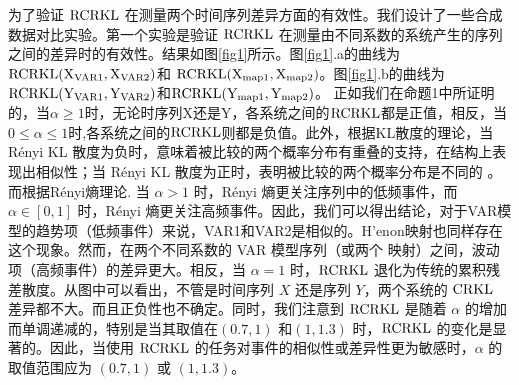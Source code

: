 为了验证 $\rm{RCRKL}$ 在测量两个时间序列差异方面的有效性。我们设计了一些合成数据对比实验。第一个实验是验证 $\rm{RCRKL}$ 在测量由不同系数的系统产生的序列之间的差异时的有效性。结果如图\ref{fig1}所示。图\ref{fig1}.a的曲线为$\rm{RCRKL(X_{VAR1}, X_{VAR2})}$和 $\rm{RCRKL(X_{\text{map}1}, X_{\text{map}2})}$。图\ref{fig1}.b的曲线为$\rm{RCRKL(Y_{VAR1}, Y_{VAR2})}$和$\rm{RCRKL(Y_{\text{map}1}, Y_{\text{map}2})}$。 正如我们在命题1中所证明的，当$\alpha\ge1$时，无论时序列X还是Y，各系统之间的$\rm{RCRKL}$都是正值，相反，当$0\le \alpha \le 1$时,各系统之间的$\rm{RCRKL}$则都是负值。此外，根据KL散度的理论，当 R\'enyi KL 散度为负时，意味着被比较的两个概率分布有重叠的支持，在结构上表现出相似性；当 R\'enyi KL 散度为正时，表明被比较的两个概率分布是不同的 \cite{22}。而根据R\'enyi熵理论\cite{17}. 当 $\alpha> 1$ 时，R\'enyi 熵更关注序列中的低频事件，而 $\alpha \in[0,1]$ 时，R\'enyi 熵更关注高频事件。因此，我们可以得出结论，对于VAR模型的趋势项（低频事件）来说，VAR1和VAR2是相似的。H'{e}non映射也同样存在这个现象。然而，在两个不同系数的 VAR 模型序列（或两个  映射）之间，波动项（高频事件）的差异更大。相反，当 $\alpha=1$ 时，$\rm{RCRKL}$ 退化为传统的累积残差散度。从图中可以看出，不管是时间序列 $X$ 还是序列 $Y$，两个系统的 $\rm{CRKL}$ 差异都不大。而且正负性也不确定。同时，我们注意到 $\rm{RCRKL}$ 是随着 $\alpha$ 的增加而单调递减的，特别是当其取值在$(0.7,1)$ 和$(1,1.3)$ 时，$\rm{RCRKL}$ 的变化是显著的。因此，当使用 $\rm{RCRKL}$ 的任务对事件的相似性或差异性更为敏感时，$\alpha$ 的取值范围应为 $(0.7,1)$ 或 $(1,1.3)$。


